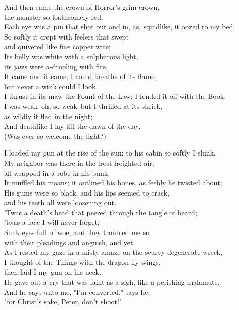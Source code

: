 \begin{poemblock}
And then came the crown of Horror's grim crown,\\
\idt the monster so loathsomely red.\\
Each eye was a pin that shot out and in, as, squidlike, it oozed to my bed;\\
So softly it crept with feelers that swept\\
\idt and quivered like fine copper wire;\\
Its belly was white with a sulphurous light,\\
\idt its jaws were a-drooling with fire.\\
It came and it came; I could breathe of its flame,\\
\idt but never a wink could I look.\\
I thrust in its maw the Fount of the Law; I fended it off with the Book.\\
I was weak--oh, so weak--but I thrilled at its shriek,\\
\idt as wildly it fled in the night;\\
And deathlike I lay till the dawn of the day.\\
\idt (Was ever so welcome the light?)

I loaded my gun at the rise of the sun; to his cabin so softly I slunk.\\
My neighbor was there in the frost-freighted air,\\
\idt all wrapped in a robe in his bunk.\\
It muffled his moans; it outlined his bones, as feebly he twisted about;\\
His gums were so black, and his lips seemed to crack,\\
\idt and his teeth all were loosening out.\\
'Twas a death's head that peered through the tangle of beard;\\
\idt 'twas a face I will never forget;\\
Sunk eyes full of woe, and they troubled me so\\
\idt with their pleadings and anguish, and yet\\
As I rested my gaze in a misty amaze on the scurvy-degenerate wreck,\\
I thought of the Things with the dragon-fly wings,\\
\idt then laid I my gun on his neck.\\
He gave out a cry that was faint as a sigh, like a perishing malamute,\\
And he says unto me, "I'm converted," says he;\\
\idt "for Christ's sake, Peter, don't shoot!"


\end{poemblock}
